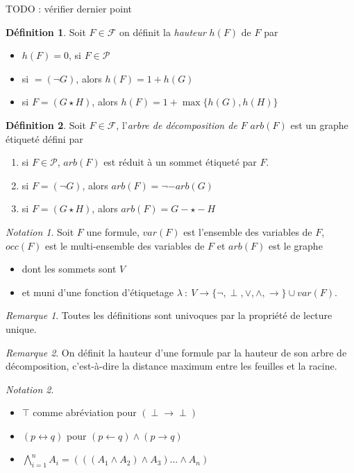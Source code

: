 \documentclass[]{article}
\theoremstyle{remark}
\newtheorem{mynot}{Notation}
\newtheorem{myrem}{Remarque}
\theoremstyle{definition}
\newtheorem{mydef}{Définition}
\begin{document}
TODO : vérifier dernier point

\begin{mydef}
	Soit $F \in \mathcal{F}$ on définit la \textit{hauteur} $h(F)$ de $F$ par
	\begin{itemize}
		\item $h(F) = 0$, si $F \in \mathcal{P}$
		\item si $=(\neg G)$, alors $h(F) = 1 + h(G)$
		\item si $F = (G \star H)$, alors $h(F) = 1 + \max\{h(G), h(H)\}$
	\end{itemize}
\end{mydef}

\begin{mydef}
	Soit $F \in \mathcal{F}$, l'\textit{arbre de décomposition de $F$} $arb(F)$ est un graphe étiqueté défini par
	
	\begin{enumerate}
		\item si $F \in \mathcal{P}$, $arb(F)$ est réduit à un sommet étiqueté par $F$.
		\item si $F = (\neg G)$, alors $arb(F) = \neg - arb(G)$
		\item si $F = (G \star H)$, alors $arb(F) = G - \star - H$
	\end{enumerate}
\end{mydef}

\begin{mynot}
	Soit $F$ une formule, $var(F)$ est l'ensemble des variables de $F$, $occ(F)$ est le multi-ensemble des variables de $F$ et $arb(F)$ est le graphe
	\begin{itemize}
		\item dont les sommets sont $V$
		\item et muni d'une fonction d'étiquetage $\lambda ~ : ~ V \longrightarrow \{\neg, \perp, \lor, \land, \rightarrow \} \cup var(F)$.
	\end{itemize}
\end{mynot}

\begin{myrem}
	Toutes les définitions sont univoques par la propriété de lecture unique.
\end{myrem}

\begin{myrem}
	On définit la hauteur d'une formule par la hauteur de son arbre de décomposition, c'est-à-dire la distance maximum entre les feuilles et la racine. 
\end{myrem}

\begin{mynot}
	\leavevmode
	\begin{itemize}
		\item $\top$ comme abréviation pour $(\perp \rightarrow \perp)$
		\item $(p \longleftrightarrow q)$ pour $(p \leftarrow q) \land (p \rightarrow q)$
		\item $\bigwedge\limits_{i=1}^n A_i = (((A_1 \land A_2) \land A_3)... \land A_n)$
	\end{itemize}
\end{mynot}
\end{document}
